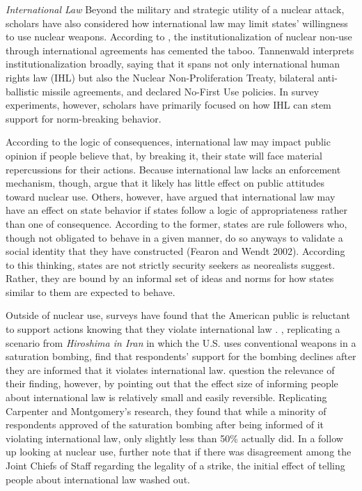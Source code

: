 \documentclass[12pt]{article}
\begin{document}
\textit{International Law}
\noindent
Beyond the military and strategic utility of a nuclear attack, scholars have also considered how international law may limit states' willingness to use nuclear weapons. According to \citet{tannenwald_nuclear_2007}, the institutionalization of nuclear non-use through international agreements has cemented the taboo. Tannenwald interprets institutionalization broadly, saying that it spans not only international human rights law (IHL) but also the Nuclear Non-Proliferation Treaty, bilateral anti-ballistic missile agreements, and declared No-First Use policies. In survey experiments, however, scholars have primarily focused on how IHL can stem support for norm-breaking behavior.

According to the logic of consequences, international law may impact public opinion if people believe that, by breaking it, their state will face material repercussions for their actions. Because international law lacks an enforcement mechanism, though, \citet{sagan_does_2020} argue that it likely has little effect on public attitudes toward nuclear use. Others, however, have argued that international law may have an effect on state behavior if states follow a logic of appropriateness rather than one of consequence. According to the former, states are rule followers who, though not obligated to behave in a given manner, do so anyways to validate a social identity that they have constructed (Fearon and Wendt 2002). According to this thinking, states are not strictly security seekers as neorealists suggest. Rather, they are bound by an informal set of ideas and norms for how states similar to them are expected to behave. 

Outside of nuclear use, surveys have found that the American public is reluctant to support actions knowing that they violate international law \citep{chilton_laws_2014, kreps_flying_2014}. \citet{carpenter_stopping_2020}, replicating a scenario from \textit{Hiroshima in Iran} in which the U.S. uses conventional weapons in a saturation bombing, find that respondents' support for the bombing declines after they are informed that it violates international law. \citet{sagan_does_2020} question the relevance of their finding, however, by pointing out that the effect size of informing people about international law is relatively small and easily reversible. Replicating Carpenter and Montgomery's research, they found that while a minority of respondents approved of the saturation bombing after being informed of it violating international law, only slightly less than 50\% actually did. In a follow up looking at nuclear use, \citet{sagan_atomic_2024} further note that if there was disagreement among the Joint Chiefs of Staff regarding the legality of a strike, the initial effect of telling people about international law washed out.
\end{document}

